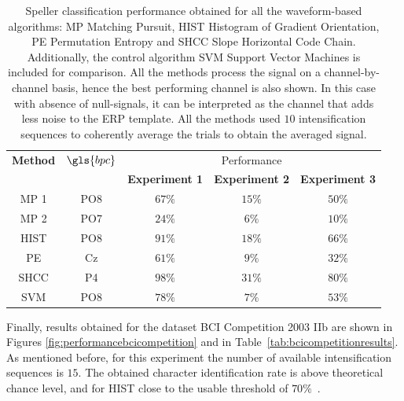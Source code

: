 \begin{table}[h!]
\caption[Pseudo-real Dataset Speller Performance]{Speller classification performance obtained for all the waveform-based algorithms: MP Matching Pursuit, HIST Histogram of Gradient Orientation, PE Permutation Entropy and SHCC Slope Horizontal Code Chain. Additionally, the control algorithm SVM Support Vector Machines is included for comparison.  All the methods process the signal on a channel-by-channel basis, hence the best performing channel is also shown. In this case with absence of null-signals, it can be interpreted as the channel that adds less noise to the ERP template.  All the methods used $10$ intensification sequences to coherently average the trials to obtain the averaged signal. }
\centering
\begin{tabular}{ccccc}
\toprule
\textbf{Method}	& \textbf{$\gls{bpc}$} &   \multicolumn{3}{c}{Performance} \\
 	&  &  \textbf{Experiment 1} & \textbf{Experiment 2}	& \textbf{Experiment 3}\\
\midrule
MP 1 & PO8  & $67\%$ & $15\%$ & $50\%$\\
MP 2 & PO7 & $24\%$ & $6\%$ & $10\%$\\
HIST  & PO8 & $91\%$ & $18\%$ & $66\%$\\
PE     & Cz & $61\%$ & $9\%$ & $32\%$\\
SHCC & P4 & $98\%$ & $31\%$ & $80\%$\\
SVM     & PO8  & $78\%$ & $7\%$ & $53\%$\\
\bottomrule
\end{tabular}
\label{tab:results}
\end{table}

Finally, results obtained for the dataset BCI Competition 2003 IIb are shown in Figures \ref{fig:performancebcicompetition} and in Table~\ref{tab:bcicompetitionresults}.  As mentioned before, for this experiment the number of available intensification sequences is $15$. The obtained character identification rate is above theoretical chance level, and for HIST close to the usable threshold of $70\%$~\cite{Kathner2017}.

